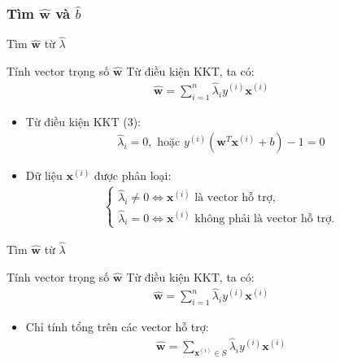 \documentclass[serif, aspectratio=169]{beamer}
\begin{document}
	\subsubsection{Tìm $\hat{\mathbf{w}}$ và $\hat{b}$}
	\begin{frame}{Tìm $\hat{\mathbf{w}}$ từ $\hat{\lambda}$}
		\begin{block}{Tính vector trọng số $\hat{\mathbf{w}}$}
			Từ điều kiện KKT, ta có:
			\begin{align*}
				\hat{\mathbf{w}} = \sum_{i=1}^n \hat{\lambda}_i y^{(i)} \mathbf{x}^{(i)}
			\end{align*}
		\end{block}
		\begin{itemize}
			\item Từ điều kiện KKT (3):
			\begin{align*}
				\hat{\lambda}_i = 0, \text{ hoặc } y^{(i)}(\mathbf{w}^T \mathbf{x}^{(i)} + b) - 1 = 0
			\end{align*}
			\item Dữ liệu $\mathbf{x}^{(i)}$ được phân loại:
			\begin{align*}
				\begin{cases}
					\hat{\lambda}_i \neq 0 \Leftrightarrow \mathbf{x}^{(i)} \text{ là vector hỗ trợ}, \\
					\hat{\lambda}_i = 0 \Leftrightarrow \mathbf{x}^{(i)} \text{ không phải là vector hỗ trợ}.
				\end{cases}
			\end{align*}
		\end{itemize}
	\end{frame}
	
	\begin{frame}{Tìm $\hat{\mathbf{w}}$ từ $\hat{\lambda}$}
		\begin{block}{Tính vector trọng số $\hat{\mathbf{w}}$}
			Từ điều kiện KKT, ta có:
			\begin{align*}
				\hat{\mathbf{w}} = \sum_{i=1}^n \hat{\lambda}_i y^{(i)} \mathbf{x}^{(i)}
			\end{align*}
		\end{block}
		\begin{itemize}
			\item Chỉ tính tổng trên các vector hỗ trợ:
			\begin{align*}
				\hat{\mathbf{w}} = \sum_{\mathbf{x}^{(i)} \in S} \hat{\lambda}_i y^{(i)} \mathbf{x}^{(i)}
			\end{align*}
		\end{itemize}
	\end{frame}
	
\end{document}
